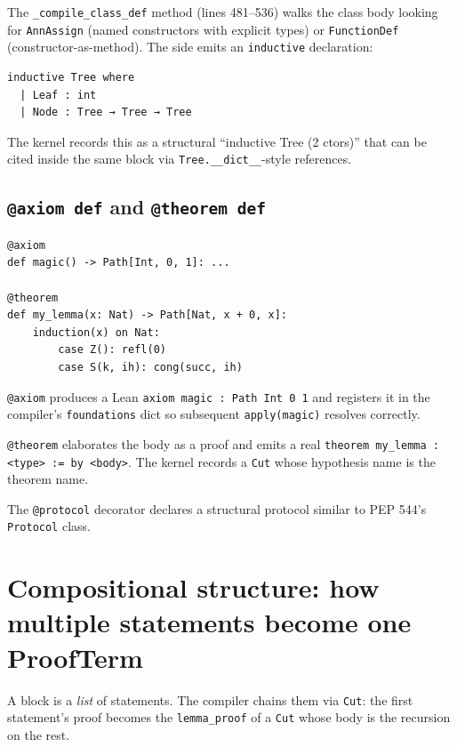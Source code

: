 The \texttt{\_compile\_class\_def} method (lines 481--536) walks the
class body looking for \texttt{AnnAssign} (named constructors with
explicit types) or \texttt{FunctionDef} (constructor-as-method).
The \Lean{} side emits an \verb|inductive| declaration:
\begin{lstlisting}[language=lean4]
inductive Tree where
  | Leaf : int
  | Node : Tree → Tree → Tree
\end{lstlisting}

The kernel records this as a structural ``inductive Tree (2 ctors)''
that can be cited inside the same \PSDL{} block via
\texttt{Tree.\_\_dict\_\_}-style references.

\subsection{\texttt{@axiom def} and \texttt{@theorem def}}

\begin{lstlisting}[language=psdl]
@axiom
def magic() -> Path[Int, 0, 1]: ...

@theorem
def my_lemma(x: Nat) -> Path[Nat, x + 0, x]:
    induction(x) on Nat:
        case Z(): refl(0)
        case S(k, ih): cong(succ, ih)
\end{lstlisting}

\texttt{@axiom} produces a Lean \verb|axiom magic : Path Int 0 1|
and registers it in the \PSDL{} compiler's \texttt{foundations}
dict so subsequent \texttt{apply(magic)} resolves correctly.

\texttt{@theorem} elaborates the body as a \PSDL{} proof and emits a
real \verb|theorem my_lemma : <type> := by <body>|.  The kernel
records a \texttt{Cut} whose hypothesis name is the theorem name.

The \texttt{@protocol} decorator declares a structural protocol
similar to PEP 544's \texttt{Protocol} class.

\section{Compositional structure: how multiple statements become one ProofTerm}
\label{sec:psdl-composition}

A \PSDL{} block is a \emph{list} of statements.  The compiler chains
them via \texttt{Cut}: the first statement's proof becomes the
\texttt{lemma\_proof} of a \texttt{Cut} whose body is the recursion
on the rest.

